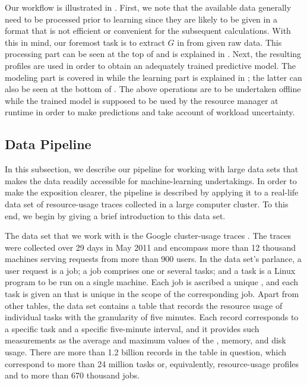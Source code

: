 Our workflow is illustrated in . First, we note that the
available data generally need to be processed prior to learning since they are
likely to be given in a format that is not efficient or convenient for the
subsequent calculations. With this in mind, our foremost task is to extract $G$
in  from given raw data. This processing part can be seen
at the top of  and is explained in .
Next, the resulting profiles are used in order to obtain an adequately trained
predictive model. The modeling part is covered in  while the
learning part is explained in ; the latter can also be
seen at the bottom of . The above operations are to be
undertaken offline while the trained model is supposed to be used by the
resource manager at runtime in order to make predictions and take account of
workload uncertainty.

\subsection{Data Pipeline}

In this subsection, we describe our pipeline for working with large data sets
that makes the data readily accessible for machine-learning undertakings. In
order to make the exposition clearer, the pipeline is described by applying it
to a real-life data set of resource-usage traces collected in a large computer
cluster. To this end, we begin by giving a brief introduction to this data set.

The data set that we work with is the Google cluster-usage traces
\cite{reiss2011}. The traces were collected over 29 days in May 2011 and
encompass more than 12 thousand machines serving requests from more than 900
users. In the data set's parlance, a user request is a job; a job comprises one
or several tasks; and a task is a Linux program to be run on a single machine.
Each job is ascribed a unique , and each task is given an  that is
unique in the scope of the corresponding job. Apart from other tables, the data
set contains a table that records the resource usage of individual tasks with
the granularity of five minutes. Each record corresponds to a specific task and
a specific five-minute interval, and it provides such measurements as the
average and maximum values of the , memory, and disk usage. There are
more than 1.2 billion records in the table in question, which correspond to more
than 24 million tasks or, equivalently, resource-usage profiles and to more than
670 thousand jobs.

